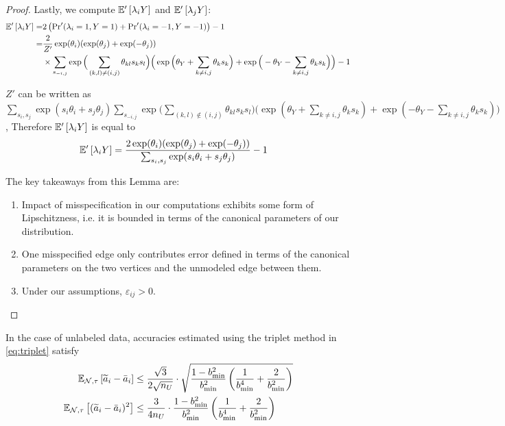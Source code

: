 \begin{proof}
Lastly, we compute $\mathbb{E}'_{}\left[\lambda_i Y\right]$ and $\mathbb{E}'_{}\left[\lambda_j Y\right]$:
\begin{align}
    \mathbb{E}'_{}\left[\lambda_i Y\right] = &2 \left(\textrm{Pr}'(\lambda_i = 1, Y = 1) + \textrm{Pr}'(\lambda_i = -1, Y = -1) \right) - 1 \\
    = &\frac{2}{Z'} \exp(\theta_i) (\exp(\theta_j) + \exp(-\theta_j)) \\
    & \times \sum_{s_{-i, j}} \exp \Big( \sum_{(k, l) \neq (i, j)} \theta_{kl} s_k s_l\Big) \Big(\exp\Big(\theta_Y + \sum_{k \neq i, j} \theta_k s_k\Big) + \exp\Big(-\theta_Y - \sum_{k \neq i, j} \theta_k s_k\Big)\Big) - 1
\end{align}

$Z'$ can be written as $\sum_{s_i, s_j} \exp(s_i \theta_i + s_j \theta_j) \sum_{s_{-i, j}} \exp \Big(\sum_{(k, l) \notin (i, j)} \theta_{kl} s_k s_l \Big)\Big(\exp(\theta_Y + \sum_{k \neq i, j} \theta_k s_k) + \exp(-\theta_Y - \sum_{k \neq i, j} \theta_k s_k) \Big)$, Therefore $\mathbb{E}'_{}\left[\lambda_i Y\right]$ is equal to
\begin{align}
    \mathbb{E}'_{}\left[\lambda_i Y\right] &= \frac{2 \exp(\theta_i) (\exp(\theta_j) + \exp(-\theta_j))}{\sum_{s_i, s_j} \exp(s_i \theta_i + s_j \theta_j)} - 1
\end{align}

The key takeaways from this Lemma are:
\begin{enumerate}
    \item Impact of misspecification in our computations exhibits some form of Lipschitzness, i.e. it is bounded in terms of the canonical parameters of our distribution. 
    \item One misspecified edge only contributes error defined in terms of the canonical parameters on the two vertices and the unmodeled edge between them.
    \item Under our assumptions, $\varepsilon_{ij} > 0$.
\end{enumerate}

\end{proof}


\begin{lemma} In the case of unlabeled data, accuracies estimated using the triplet method in \eqref{eq:triplet} satisfy
\begin{align*}
\mathbb{E}_{\mathcal{N}, \tau}\left[\widetilde{a}_i - \bar{a}_i\right] &\le \frac{\sqrt{3}}{2\sqrt{n_U}} \cdot \sqrt{\frac{1 - b_{\min}^2}{b_{\min}^2} \left(\frac{1}{b_{\min}^4} + \frac{2}{b_{\min}^2} \right)}\\
\mathbb{E}_{\mathcal{N}, \tau}\left[(\widetilde{a}_i - \bar{a}_i)^2\right] &\le \frac{3}{4 n_U} \cdot \frac{1 - b_{\min}^2}{b_{\min}^2} \left(\frac{1}{b_{\min}^4} + \frac{2}{b_{\min}^2} \right)
\end{align*}
\label{lemma:sampling_error}
\end{lemma}

